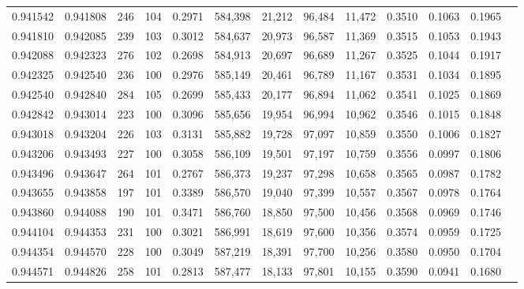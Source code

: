 \begin{tabular}{rrrrrrrrrrrrr}
0.941542 & 0.941808 &   246 & 104 &                                     0.2971 & 584,398 &  21,212 &  96,484 &  11,472 & 0.3510 & 0.1063 & 0.1965 \\
0.941810 & 0.942085 &   239 & 103 &                                     0.3012 & 584,637 &  20,973 &  96,587 &  11,369 & 0.3515 & 0.1053 & 0.1943 \\
0.942088 & 0.942323 &   276 & 102 &                                     0.2698 & 584,913 &  20,697 &  96,689 &  11,267 & 0.3525 & 0.1044 & 0.1917 \\
0.942325 & 0.942540 &   236 & 100 &                                     0.2976 & 585,149 &  20,461 &  96,789 &  11,167 & 0.3531 & 0.1034 & 0.1895 \\
0.942540 & 0.942840 &   284 & 105 &                                     0.2699 & 585,433 &  20,177 &  96,894 &  11,062 & 0.3541 & 0.1025 & 0.1869 \\
0.942842 & 0.943014 &   223 & 100 &                                     0.3096 & 585,656 &  19,954 &  96,994 &  10,962 & 0.3546 & 0.1015 & 0.1848 \\
0.943018 & 0.943204 &   226 & 103 &                                     0.3131 & 585,882 &  19,728 &  97,097 &  10,859 & 0.3550 & 0.1006 & 0.1827 \\
0.943206 & 0.943493 &   227 & 100 &                                     0.3058 & 586,109 &  19,501 &  97,197 &  10,759 & 0.3556 & 0.0997 & 0.1806 \\
0.943496 & 0.943647 &   264 & 101 &                                     0.2767 & 586,373 &  19,237 &  97,298 &  10,658 & 0.3565 & 0.0987 & 0.1782 \\
0.943655 & 0.943858 &   197 & 101 &                                     0.3389 & 586,570 &  19,040 &  97,399 &  10,557 & 0.3567 & 0.0978 & 0.1764 \\
0.943860 & 0.944088 &   190 & 101 &                                     0.3471 & 586,760 &  18,850 &  97,500 &  10,456 & 0.3568 & 0.0969 & 0.1746 \\
0.944104 & 0.944353 &   231 & 100 &                                     0.3021 & 586,991 &  18,619 &  97,600 &  10,356 & 0.3574 & 0.0959 & 0.1725 \\
0.944354 & 0.944570 &   228 & 100 &                                     0.3049 & 587,219 &  18,391 &  97,700 &  10,256 & 0.3580 & 0.0950 & 0.1704 \\
0.944571 & 0.944826 &   258 & 101 &                                     0.2813 & 587,477 &  18,133 &  97,801 &  10,155 & 0.3590 & 0.0941 & 0.1680 \\

\end{tabular}
